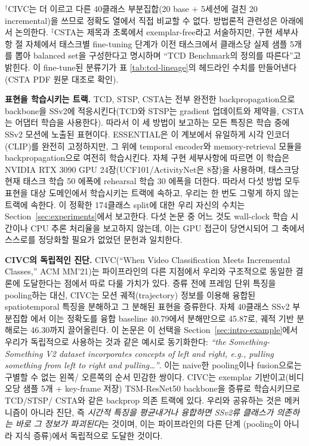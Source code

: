 \documentclass[11pt]{article}
\begin{document}
$^\dagger$CIVC는 더 이르고 다른 40클래스 부분집합(20 base $+$ 5세션에
걸친 20 incremental)을 쓰므로 정확도 열에서 직접 비교할 수 없다. 방법론적
관련성은 아래에서 논의한다.
$^\ddagger$CSTA는 제목과 초록에서 exemplar-free라고 서술하지만, 구현
세부사항 절 자체에서 태스크별 fine-tuning 단계가 이전 태스크에서 클래스당
실제 샘플 5개를 뽑아 balanced set을 구성한다고 명시하며 ``TCD Benchmark의
정의를 따른다''고 밝힌다. 이 fine-tune된 분류기가 표
\ref{tab:tcd-lineage}의 헤드라인 수치를 만들어낸다(CSTA PDF 원문 대조로
확인).

\textbf{표현을 학습시키는 트랙.} TCD, STSP, CSTA는 전부 완전한 backpropagation으로 backbone을 SSv2에
적응시킨다(TCD와 STSP는 gradient 업데이트와 제약을, CSTA는 어댑터 학습을
사용한다). 따라서 이 세 방법이 보고하는 모든 특징은 학습 중에 SSv2 모션에
노출된 표현이다. ESSENTIAL은 이 계보에서 유일하게 시각 인코더(CLIP)를
완전히 고정하지만, 그 위에 temporal encoder와 memory-retrieval 모듈을
backpropagation으로 여전히 학습시킨다. 자체 구현 세부사항에 따르면 이
학습은 NVIDIA RTX 3090 GPU 24장(UCF101/ActivityNet은 8장)을 사용하며,
태스크당 현재 태스크 학습 50 에폭에 rehearsal 학습 30 에폭을 더한다.
따라서 다섯 방법 모두 표현을 대상 도메인에서 학습시키는 트랙에 속하고,
우리는 한 번도 그렇게 하지 않는 트랙에 속한다. 이 정확한 174클래스
split에 대한 우리 자신의 수치는 Section~\ref{sec:experiments}에서 보고한다.
다섯 논문 중 어느 것도
wall-clock 학습 시간이나 CPU 추론 처리율을 보고하지 않는데, 이는 GPU
접근이 당연시되어 그 축에서 스스로를 정당화할 필요가 없었던 문헌과
일치한다.

\textbf{CIVC의 독립적인 진단.} CIVC(``When Video Classification Meets Incremental Classes,'' ACM MM'21)는
파이프라인의 다른 지점에서 우리와 구조적으로 동일한 결론에 도달한다는
점에서 따로 다룰 가치가 있다. 증류 전에 프레임 단위 특징을 pooling하는
대신, CIVC는 모션 궤적(trajectory) 정보를 이용해 융합된 spatiotemporal
특징을 분해하고 그 분해된 표현을 증류한다. 자체 40클래스 SSv2 부분집합
에서 이는 정확도를 융합 baseline 40.79에서 분해만으로 45.87로, 궤적 기반
분해로는 46.30까지 끌어올린다. 이 논문은 이 선택을
Section~\ref{sec:intro-example}에서 우리가 독립적으로 사용하는 것과 같은 예시로
동기화한다: \emph{``the Something-Something V2 dataset incorporates
concepts of left and right, e.g., pulling something from left to right and
pulling\ldots''}. 이는 naive한 pooling이나 fusion으로는 구별할 수 없는 왼쪽/
오른쪽의 순서 민감한 쌍이다. CIVC는 exemplar 기반이고(비디오당 샘플 5개
+ key-frame 저장) TSM-ResNet50 backbone을 증류로 학습시키므로 TCD/STSP/
CSTA와 같은 backprop 의존 트랙에 있다. 우리와 공유하는 것은 메커니즘이
아니라 진단, 즉 \emph{시간적 특징을 평균내거나 융합하면 SSv2류 클래스가
의존하는 바로 그 정보가 파괴된다}는 것이며, 이는 파이프라인의 다른 단계
(pooling이 아니라 지식 증류)에서 독립적으로 도달한 것이다.
\end{document}
